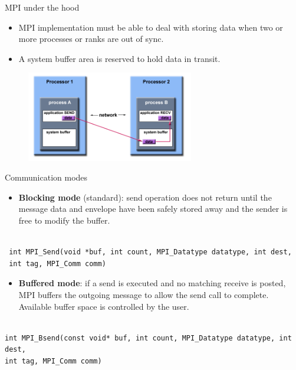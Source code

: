 \begin{frame}[fragile]{MPI under the hood}

\begin{itemize}
\item MPI implementation must be able to deal with storing data when two or more processes or ranks are out of sync. 
\item A system buffer area is reserved to hold data in transit.
\end{itemize}

\begin{figure}
    \centering
    \includegraphics[width=0.65\textwidth]{img/MPIBuffering.png}
\end{figure} 


\end{frame}

\begin{frame}[fragile]{Communication modes}

\begin{itemize}
\item \textbf{Blocking mode} (standard): send operation does not return until the message data and envelope have been safely stored away and the sender is free to modify the buffer. 
\end{itemize}

\small\begin{verbatim}

 int MPI_Send(void *buf, int count, MPI_Datatype datatype, int dest,
 int tag, MPI_Comm comm)

\end{verbatim}
\normalsize


\begin{itemize}
\item \textbf{Buffered mode}: if a send is executed and no matching receive is posted, MPI buffers the outgoing message  to allow the send call to complete. Available buffer space is controlled
by the user.
\end{itemize}

\small\begin{verbatim}

int MPI_Bsend(const void* buf, int count, MPI_Datatype datatype, int dest,
int tag, MPI_Comm comm)

\end{verbatim}
\normalsize

\end{frame}

